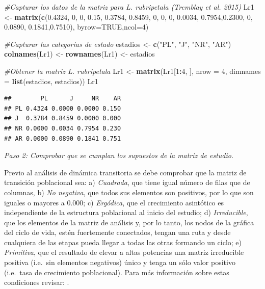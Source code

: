 \documentclass[
]{book}
\newenvironment{Shaded}{\begin{snugshade}}{\end{snugshade}}
\newcommand{\AttributeTok}[1]{\textcolor[rgb]{0.13,0.29,0.53}{#1}}
\newcommand{\CommentTok}[1]{\textcolor[rgb]{0.56,0.35,0.01}{\textit{#1}}}
\newcommand{\ConstantTok}[1]{\textcolor[rgb]{0.56,0.35,0.01}{#1}}
\newcommand{\DecValTok}[1]{\textcolor[rgb]{0.00,0.00,0.81}{#1}}
\newcommand{\FloatTok}[1]{\textcolor[rgb]{0.00,0.00,0.81}{#1}}
\newcommand{\FunctionTok}[1]{\textcolor[rgb]{0.13,0.29,0.53}{\textbf{#1}}}
\newcommand{\NormalTok}[1]{#1}
\newcommand{\OtherTok}[1]{\textcolor[rgb]{0.56,0.35,0.01}{#1}}
\newcommand{\SpecialCharTok}[1]{\textcolor[rgb]{0.81,0.36,0.00}{\textbf{#1}}}
\newcommand{\StringTok}[1]{\textcolor[rgb]{0.31,0.60,0.02}{#1}}
\theoremstyle{definition}
\theoremstyle{definition}
\theoremstyle{definition}
\theoremstyle{definition}
\theoremstyle{remark}
\begin{document}
\begin{Shaded}
\begin{Highlighting}[]
\CommentTok{\#Capturar los datos de la matriz para L. rubripetala (Tremblay et al. 2015)}
\NormalTok{Lr1 }\OtherTok{\textless{}{-}} \FunctionTok{matrix}\NormalTok{(}\FunctionTok{c}\NormalTok{(}\FloatTok{0.4324}\NormalTok{, }\DecValTok{0}\NormalTok{,      }\DecValTok{0}\NormalTok{,     }\FloatTok{0.15}\NormalTok{,}
               \FloatTok{0.3784}\NormalTok{, }\FloatTok{0.8459}\NormalTok{, }\DecValTok{0}\NormalTok{,     }\DecValTok{0}\NormalTok{,}
               \DecValTok{0}\NormalTok{,      }\FloatTok{0.0034}\NormalTok{, }\FloatTok{0.7954}\NormalTok{,}\FloatTok{0.2300}\NormalTok{,}
               \DecValTok{0}\NormalTok{,      }\FloatTok{0.0890}\NormalTok{, }\FloatTok{0.1841}\NormalTok{,}\FloatTok{0.7510}\NormalTok{), }\AttributeTok{byrow=}\ConstantTok{TRUE}\NormalTok{,}\AttributeTok{ncol=}\DecValTok{4}\NormalTok{)}

\CommentTok{\#Capturar las categorias de estado}
\NormalTok{estadios }\OtherTok{\textless{}{-}} \FunctionTok{c}\NormalTok{(}\StringTok{"PL"}\NormalTok{, }\StringTok{"J"}\NormalTok{, }\StringTok{"NR"}\NormalTok{, }\StringTok{"AR"}\NormalTok{)}
\FunctionTok{colnames}\NormalTok{(Lr1) }\OtherTok{\textless{}{-}} \FunctionTok{rownames}\NormalTok{(Lr1) }\OtherTok{\textless{}{-}}\NormalTok{ estadios}

\CommentTok{\#Obtener la matriz L. rubripetala }
\NormalTok{Lr1 }\OtherTok{\textless{}{-}} \FunctionTok{matrix}\NormalTok{(Lr1[}\DecValTok{1}\SpecialCharTok{:}\DecValTok{4}\NormalTok{, ], }\AttributeTok{nrow =} \DecValTok{4}\NormalTok{, }\AttributeTok{dimnames =} \FunctionTok{list}\NormalTok{(estadios, estadios))}
\NormalTok{Lr1}
\end{Highlighting}
\end{Shaded}

\begin{verbatim}
##        PL      J     NR    AR
## PL 0.4324 0.0000 0.0000 0.150
## J  0.3784 0.8459 0.0000 0.000
## NR 0.0000 0.0034 0.7954 0.230
## AR 0.0000 0.0890 0.1841 0.751
\end{verbatim}

\emph{Paso 2: Comprobar que se cumplan los supuestos de la matriz de estudio}.

Previo al análisis de dinámica transitoria se debe comprobar que la matriz de transición poblacional sea: a) \emph{Cuadrada}, que tiene igual número de filas que de columnas, b) \emph{No negativa}, que todos sus elementos son positivos, por lo que son iguales o mayores a 0.000; c) \emph{Ergódica}, que el crecimiento asintótico es independiente de la estructura poblacional al inicio del estudio; d) \emph{Irreducible}, que los elementos de la matriz de análisis y, por lo tanto, los nodos de la gráfica del ciclo de vida, estén fuertemente conectados, tengan una ruta y desde cualquiera de las etapas pueda llegar a todas las otras formando un ciclo; e) \emph{Primitiva}, que el resultado de elevar a altas potencias una matriz irreducible positiva (i.e.~sin elementos negativos) único y tenga un sólo valor positivo (i.e.~tasa de crecimiento poblacional). Para más información sobre estas condiciones revisar: \citep{stott2010reducibility}.
\end{document}
